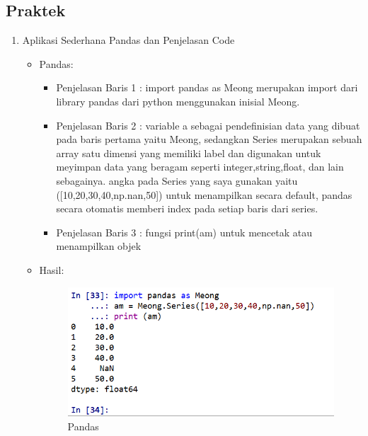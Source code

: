 \subsection{Praktek}
\begin{enumerate}
\item Aplikasi Sederhana Pandas dan Penjelasan Code
\begin{itemize}
\item Pandas:
\par 
\par
\begin{itemize}
\item Penjelasan Baris  1 : import pandas as Meong merupakan import dari library pandas dari python menggunakan inisial Meong.
\par
\item Penjelasan Baris 2 : variable a sebagai pendefinisian data yang dibuat pada baris pertama yaitu Meong, sedangkan Series merupakan sebuah array satu dimensi yang memiliki label dan digunakan untuk meyimpan data yang beragam seperti integer,string,float, dan lain sebagainya. angka pada Series yang saya gunakan yaitu ([10,20,30,40,np.nan,50]) untuk menampilkan secara default, pandas secara otomatis memberi index pada setiap baris dari series.
\par
\item Penjelasan Baris 3 : fungsi print(am) untuk mencetak atau menampilkan objek 
\par
\end{itemize}
\item Hasil:
\par
\par
\begin{figure}[ht]
\centering
\includegraphics[scale=0.8]{figures/andi/Pandas.PNG}
\caption{Pandas}
\label{contoh}
\end{figure}
\par


\end{itemize}
\end{enumerate}
